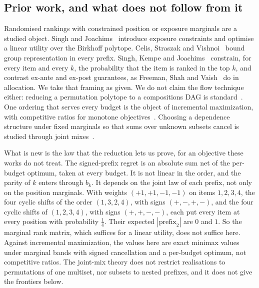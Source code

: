 \subsection{Prior work, and what does not follow from it}

Randomised rankings with constrained position or exposure marginals are a studied object.
Singh and Joachims~\cite{singh2018} introduce exposure constraints and optimise a linear
utility over the Birkhoff polytope. Celis, Straszak and Vishnoi~\cite{celis2018} bound group
representation in every prefix. Singh, Kempe and Joachims~\cite{singh2021} constrain, for every
item and every $k$, the probability that the item is ranked in the top $k$, and contrast ex-ante
and ex-post guarantees, as Freeman, Shah and Vaish~\cite{freeman2020} do in allocation. We
take that framing as given. We do not claim the flow technique either: reducing a permutation
polytope to a compositions DAG is standard~\cite{schrijver2003}. One ordering that serves every
budget is the object of incremental maximization, with competitive ratios for monotone
objectives~\cite{disser2023,bienkowski2026}. Choosing a dependence structure under fixed
marginals so that sums over unknown subsets cancel is studied through joint
mixes~\cite{koike2022}.

What is new is the law that the reduction lets us prove, for an objective these works do not
treat. The signed-prefix regret is an absolute sum net of the per-budget optimum, taken at
every budget. It is not linear in the order, and the parity of $k$ enters through $b_{k}$. It
depends on the joint law of each prefix, not only on the position marginals. With weights
$(+1,+1,-1,-1)$ on items $1,2,3,4$, the four cyclic shifts of the order $(1,3,2,4)$, with signs
$(+,-,+,-)$, and the four cyclic shifts of $(1,2,3,4)$, with signs $(+,+,-,-)$, each put every item
at every position with probability $\frac14$. Their expected $|\text{prefix}_{2}|$ are $0$ and
$1$. So the marginal rank matrix, which suffices for a linear utility, does not
suffice here. Against incremental maximization, the values here are exact minimax values under
marginal bands with signed cancellation and a per-budget optimum, not competitive ratios. The
joint-mix theory does not restrict realisations to permutations of one multiset, nor subsets to
nested prefixes, and it does not give the frontiers below.

